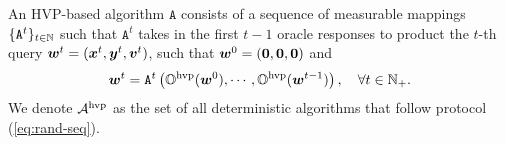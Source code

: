 \documentclass{article}
\begin{document}
\begin{dfn} \label{dfn:rand-alg-hvp}
An HVP-based algorithm $\texttt{A}$ consists of a sequence of measurable mappings $\{ \texttt{A}^{t}\}_{t \in {\mathbb{N}}}$ such that $ \texttt{A}^{t}$ takes in the first $t-1$ oracle responses to product the $t$-th query ${\bm{w}}^t = ({\bm{x}}^t,{\bm{y}}^t, {\bm{v}}^t)$, such that ${\bm{w}}^0 = ({\bm{0}},{\bm{0}}, {\bm{0}})$ and  
\begin{align}  \label{eq:rand-seq-hvp}
    {\bm{w}}^t = \texttt{A}^t \left({\mathbb{O}}^{\rm hvp}({\bm{w}}^0), \cdots, {\mathbb{O}}^{\rm hvp}({\bm{w}}^{t-1}) \right), \quad \forall t \in {\mathbb{N}}_+.
\end{align}                                                                             
We denote ${\mathcal{A}}^{{\rm hvp}}$ as the set of all deterministic algorithms that follow protocol (\ref{eq:rand-seq}).

\end{dfn}
\end{document}
